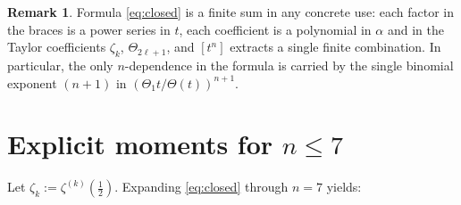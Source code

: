 \documentclass[11pt]{amsart}
\theoremstyle{definition}
\newtheorem{remark}[theorem]{Remark}
\begin{document}
\begin{remark}
Formula \eqref{eq:closed} is a finite sum in any concrete use:
each factor in the braces is a power series in $t$, each coefficient
is a polynomial in $\alpha$ and in the Taylor coefficients $\zeta_{k}$,
$\Theta_{2\ell+1}$, and $[t^{n}]$ extracts a single finite combination.
In particular, the only $n$-dependence in the formula is carried by the
single binomial exponent $(n+1)$ in $(\Theta_1 t/\Theta(t))^{n+1}$.
\end{remark}

\section{Explicit moments for $n\le 7$}

Let $\zeta_k := \zeta^{(k)}(\tfrac12)$.
Expanding \eqref{eq:closed} through $n=7$ yields:
\end{document}

